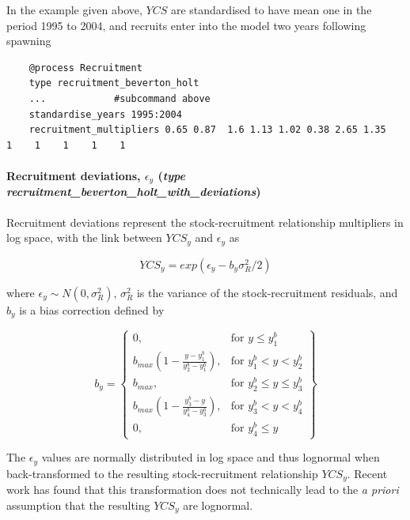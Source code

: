 In the  example given above, $YCS$ are standardised to have mean one in the period 1995 to 2004, and recruits enter into the model two years following spawning

{\small{\begin{verbatim}
	@process Recruitment
	type recruitment_beverton_holt
	...            #subcommand above
	standardise_years 1995:2004
	recruitment_multipliers 0.65 0.87  1.6 1.13 1.02 0.38 2.65 1.35    1    1    1    1    1
\end{verbatim}}}

\paragraph*{Recruitment deviations, $\epsilon_y$ (\emph{type recruitment\_beverton\_holt\_with\_deviations})} \label{sec:Process-RecruitmentBevertonHoltWithDeviations} 

Recruitment deviations represent the stock-recruitment relationship multipliers in log space, with the link between $YCS_y$ and $\epsilon_y$ as

\begin{equation}\label{eq:recruit_devs}
	YCS_y = exp(\epsilon_y - b_y\sigma^2_R / 2)
\end{equation}

where $\epsilon_y\sim N(0,\sigma^2_R)$, $\sigma^2_R$ is the variance of the stock-recruitment residuals, and $b_y$ is a bias correction defined by \cite{methot2011adjusting}

\begin{equation}\label{eq::bias}
b_y = \left\{\begin{array}{lr}
0, & \text{for }y\leq y_1^b\\
b_{max}(1 - \frac{y - y_1^b}{y_2^b - y_1^b}), & \text{for } y_1^b < y < y_2^b\\
b_{max}, & \text{for } y_2^b\leq y \leq y_3^b\\
b_{max}(1 - \frac{y_3^b - y}{y_4^b - y_3^b}), & \text{for }  y_3^b< y < y_4^b\\
0, & \text{for } y_4^b\leq y
\end{array}\right\}
\end{equation}

The $\epsilon_y$ values are normally distributed in log space and thus lognormal when back-transformed to the resulting stock-recruitment relationship $YCS_y$. Recent work has found that this transformation does not technically lead to the \textit{a priori} assumption that the resulting $YCS_y$ are lognormal. 

